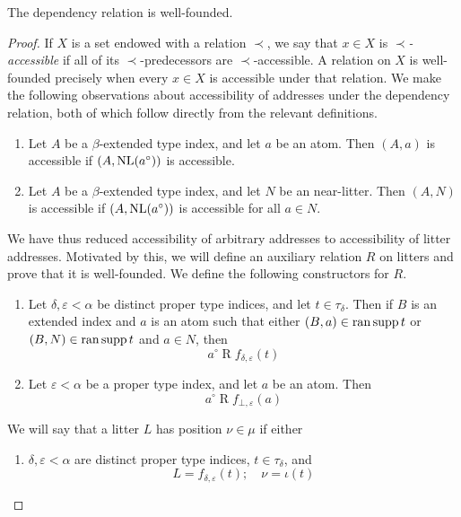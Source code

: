 \begin{proposition}
    The dependency relation is well-founded.
\end{proposition}
\begin{proof}
    If \( X \) is a set endowed with a relation \( \prec \), we say that \( x \in X \) is \emph{\( \prec \)-accessible} if all of its \( \prec \)-predecessors are \( \prec \)-accessible.
    A relation on \( X \) is well-founded precisely when every \( x \in X \) is accessible under that relation.
    We make the following observations about accessibility of addresses under the dependency relation, both of which follow directly from the relevant definitions.
    \begin{enumerate}
        \item Let \( A \) be a \( \beta \)-extended type index, and let \( a \) be an atom.
        Then \( (A, a) \) is accessible if \( (A, \operatorname{NL}(a^\circ)) \) is accessible.
        \item Let \( A \) be a \( \beta \)-extended type index, and let \( N \) be an near-litter.
        Then \( (A, N) \) is accessible if \( (A, \operatorname{NL}(a^\circ)) \) is accessible for all \( a \in N \).
    \end{enumerate}
    We have thus reduced accessibility of arbitrary addresses to accessibility of litter addresses.
    Motivated by this, we will define an auxiliary relation \( R \) on litters and prove that it is well-founded.
    We define the following constructors for \( R \).
    \begin{enumerate}
        \item Let \( \delta, \varepsilon < \alpha \) be distinct proper type indices, and let \( t \in \tau_\delta \).
        Then if \( B \) is an extended index and \( a \) is an atom such that either \( (B, a) \in \operatorname{ran} \operatorname{supp} t \) or \( (B, N) \in \operatorname{ran} \operatorname{supp} t \) and \( a \in N \), then
        \[ a^\circ \mathrel{R} f_{\delta,\varepsilon}(t) \]
        \item Let \( \varepsilon < \alpha \) be a proper type index, and let \( a \) be an atom.
        Then
        \[ a^\circ \mathrel{R} f_{\bot,\varepsilon}(a) \]
    \end{enumerate}
    We will say that a litter \( L \) has position \( \nu \in \mu \) if either
    \begin{enumerate}
        \item \( \delta, \varepsilon < \alpha \) are distinct proper type indices, \( t \in \tau_\delta \), and
        \[ L = f_{\delta,\varepsilon}(t); \quad \nu = \iota(t) \]

\end{enumerate}
\end{proof}

